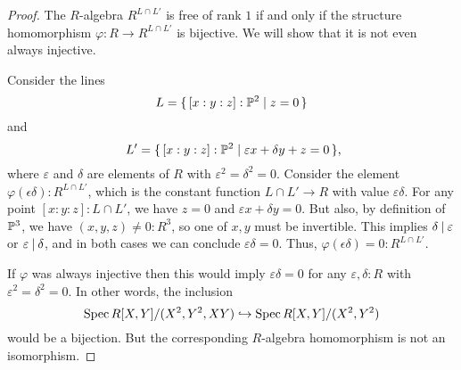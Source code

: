 \begin{proof}
  The $R$-algebra $R^{L \cap L'}$ is free of rank $1$
  if and only if the structure homomorphism
  $\varphi : R \to R^{L \cap L'}$ is bijective.
  We will show that it is not even always injective.

  Consider the lines
  \[ L = \{\, [x : y : z] : \mathbb{P}^2 \mid z = 0 \,\} \]
  and
  \[ L' = \{\, [x : y : z] : \bP^2 \mid \varepsilon x + \delta y + z = 0 \,\}
     \rlap{,} \]
  where $\varepsilon$ and $\delta$ are elements of $R$
  with $\varepsilon^2 = \delta^2 = 0$.
  Consider the element $\varphi(\epsilon \delta) : R^{L \cap L'}$,
  which is the constant function $L \cap L' \to R$
  with value $\varepsilon \delta$.
  For any point $[x : y : z] : L \cap L'$,
  we have $z = 0$ and $\varepsilon x + \delta y = 0$.
  But also, by definition of $\mathbb{P}^3$,
  we have $(x, y, z) \neq 0 : R^3$,
  so one of $x, y$ must be invertible.
  This implies $\delta \mathbin{|} \varepsilon$ or $\varepsilon \mathbin{|} \delta$,
  and in both cases we can conclude $\varepsilon \delta = 0$.
  Thus, $\varphi(\epsilon \delta) = 0 : R^{L \cap L'}$.

  If $\varphi$ was always injective
  then this would imply $\varepsilon \delta = 0$
  for any $\varepsilon, \delta : R$
  with $\varepsilon^2 = \delta^2 = 0$.
  In other words, the inclusion
  \[ \operatorname{Spec} R[X, Y]/(X^2, Y^2, XY) \hookrightarrow \operatorname{Spec} R[X, Y]/(X^2, Y^2) \]
  would be a bijection.
  But the corresponding $R$-algebra homomorphism is not an isomorphism.
\end{proof}
